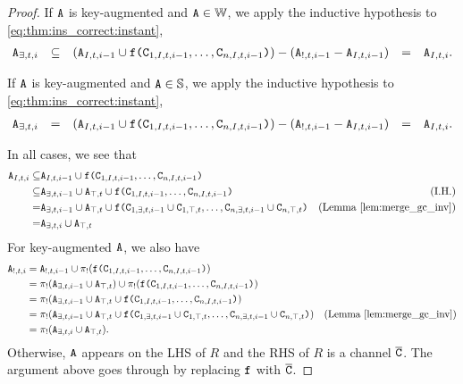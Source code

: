 \begin{proof}
If $\tt{A}$ is key-augmented and $\tt{A} \in \mathbb{W}$, we apply the inductive hypothesis to \eqref{eq:thm:ins_correct:instant},
\begin{align*}
\tt{A}_{\exists,t,i}
&&\subseteq&& (\tt{A}_{I,t,i-1} \cup \tt{f}\tt{(}\tt{C}_{1,I,t,i-1}, \dots, \tt{C}_{n,I,t,i-1}\tt{)}) - (\tt{A}_{!,t,i-1} - \tt{A}_{I,t,i-1})
&&=&& \tt{A}_{I,t,i}.
\end{align*}

If $\tt{A}$ is key-augmented and $\tt{A} \in \mathbb{S}$, we apply the inductive hypothesis to \eqref{eq:thm:ins_correct:instant},
\begin{align*}
\tt{A}_{\exists,t,i}
&&=&& (\tt{A}_{I,t,i-1} \cup \tt{f}\tt{(}\tt{C}_{1,I,t,i-1}, \dots, \tt{C}_{n,I,t,i-1}\tt{)}) - (\tt{A}_{!,t,i-1} - \tt{A}_{I,t,i-1})
&&=&& \tt{A}_{I,t,i}.
\end{align*}

In all cases, we see that
\begin{align*}
\tt{A}_{I,t,i}
\subseteq& \tt{A}_{I,t,i-1} \cup \tt{f}\tt{(}\tt{C}_{1,I,t,i-1}, \dots, \tt{C}_{n,I,t,i-1}\tt{)}\\
\subseteq& \tt{A}_{\exists,t,i-1} \cup \tt{A}_{\top,t} \cup \tt{f}\tt{(}\tt{C}_{1,I,t,i-1}, \dots, \tt{C}_{n,I,t,i-1}\tt{)} & \text{(I.H.)}\\
=& \tt{A}_{\exists,t,i-1} \cup \tt{A}_{\top,t} \cup \tt{f}\tt{(}\tt{C}_{1,\exists,t,i-1} \cup \tt{C}_{1,\top,t}, \dots, \tt{C}_{n,\exists,t,i-1} \cup \tt{C}_{n,\top,t}\tt{)} & \text{(Lemma \ref{lem:merge_gc_inv})}\\
=& \tt{A}_{\exists,t,i} \cup \tt{A}_{\top,t}
\end{align*}
For key-augmented $\tt{A}$, we also have
\begin{align*}
\tt{A}_{!,t,i}
&= \tt{A}_{!,t,i-1} \cup \pi_!(\tt{f}\tt{(}\tt{C}_{1,I,t,i-1}, \dots, \tt{C}_{n,I,t,i-1}\tt{)})\\
&= \pi_!(\tt{A}_{\exists,t,i-1} \cup \tt{A}_{\top,t}) \cup \pi_!(\tt{f}\tt{(}\tt{C}_{1,I,t,i-1}, \dots, \tt{C}_{n,I,t,i-1}\tt{)})\\
&= \pi_!(\tt{A}_{\exists,t,i-1} \cup \tt{A}_{\top,t} \cup \tt{f}\tt{(}\tt{C}_{1,I,t,i-1}, \dots, \tt{C}_{n,I,t,i-1}\tt{)})\\
&= \pi_!(\tt{A}_{\exists,t,i-1} \cup \tt{A}_{\top,t} \cup \tt{f}\tt{(}\tt{C}_{1,\exists,t,i-1} \cup \tt{C}_{1,\top,t}, \dots, \tt{C}_{n,\exists,t,i-1} \cup \tt{C}_{n,\top,t}\tt{)}) & \text{(Lemma \ref{lem:merge_gc_inv})}\\
&= \pi_!(\tt{A}_{\exists,t,i} \cup \tt{A}_{\top,t}).
\end{align*}
Otherwise, $\tt{A}$ appears on the LHS of $R$ and the RHS of $R$ is a channel $\overline{\tt{C}}$.
The argument above goes through by replacing $\tt{f}$ with $\overline{\tt{C}}$.


\end{proof}
